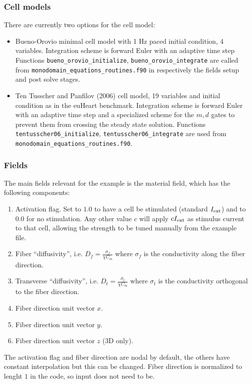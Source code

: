 \subsubsection{Cell models}
There are currently two options for the cell model:
\begin{itemize}
 \item   Bueno-Orovio minimal cell model  with 1 Hz paced initial condition, 4 variables. 
 Integration scheme is forward Euler with an adaptive time step 
Functions \verb!bueno_orovio_initialize!, \verb!bueno_orovio_integrate! are called from \verb!monodomain_equations_routines.f90! in respectively the fields setup and post solve stages. 
 \item   Ten Tusscher and Panfilov (2006) cell model, 19 variables and initial condition as in the euHeart benchmark. Integration scheme is forward Euler with an adaptive time step and a specialized scheme for the $m,d$ gates to prevent them from crossing the steady state solution.
Functions \verb!tentusscher06_initialize!, \verb!tentusscher06_integrate! are used from \verb!monodomain_equations_routines.f90!.
\end{itemize}



\subsubsection{Fields}
The main fields relevant for the example is the material field, which has the following components:
\begin{enumerate}
 \item Activation flag. Set to $1.0$ to have a cell be stimulated (standard $I_{\text{ext}}$) and to $0.0$ for no stimulation. Any other value $c$ will apply $c I_{\text{ext}}$ as stimulus current to that cell, allowing the strength to be tuned manually from the example file.
 \item Fiber ``diffusivity'', i.e. $D_f=\frac{\sigma_f}{\chi C_m}$ where $\sigma_f$ is the conductivity along the fiber direction.
 \item Transverse ``diffusivity'', i.e. $D_t=\frac{\sigma_t}{\chi C_m}$ where $\sigma_t$ is the conductivity orthogonal to the fiber direction.
 \item Fiber direction unit vector $x$.
 \item Fiber direction unit vector $y$.
 \item Fiber direction unit vector $z$ (3D only).
\end{enumerate}
The activation flag and fiber direction are nodal by default, the others have constant interpolation but this can be changed.
Fiber direction is normalized to lenght $1$ in the code, so input does not need to be.

